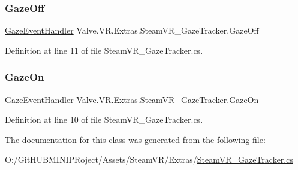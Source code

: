 \subsubsection{\texorpdfstring{GazeOff}{GazeOff}}
{\footnotesize\ttfamily \mbox{\hyperlink{namespace_valve_1_1_v_r_1_1_extras_a4cb3a72925225d55e7ba6357ef173696}{Gaze\+Event\+Handler}} Valve.\+V\+R.\+Extras.\+Steam\+V\+R\+\_\+\+Gaze\+Tracker.\+Gaze\+Off}



Definition at line 11 of file Steam\+V\+R\+\_\+\+Gaze\+Tracker.\+cs.

\mbox{\label{class_valve_1_1_v_r_1_1_extras_1_1_steam_v_r___gaze_tracker_ae4bf23980f9d4691397085e6035b9c2f}} 
\subsubsection{\texorpdfstring{GazeOn}{GazeOn}}
{\footnotesize\ttfamily \mbox{\hyperlink{namespace_valve_1_1_v_r_1_1_extras_a4cb3a72925225d55e7ba6357ef173696}{Gaze\+Event\+Handler}} Valve.\+V\+R.\+Extras.\+Steam\+V\+R\+\_\+\+Gaze\+Tracker.\+Gaze\+On}



Definition at line 10 of file Steam\+V\+R\+\_\+\+Gaze\+Tracker.\+cs.



The documentation for this class was generated from the following file\+:\begin{DoxyCompactItemize}
\item 
O\+:/\+Git\+H\+U\+B\+M\+I\+N\+I\+P\+Roject/\+Assets/\+Steam\+V\+R/\+Extras/\mbox{\hyperlink{_steam_v_r___gaze_tracker_8cs}{Steam\+V\+R\+\_\+\+Gaze\+Tracker.\+cs}}\end{DoxyCompactItemize}
